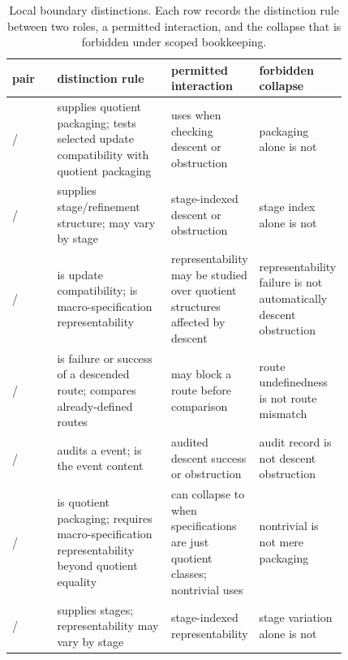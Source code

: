 
\begin{landscape}
\begin{table}
\caption{Local boundary distinctions. Each row records the distinction
rule between two roles, a permitted interaction, and the collapse that
is forbidden under scoped bookkeeping.}
\label{tab:boundary-matrix}
\centering
\footnotesize
\renewcommand{\arraystretch}{1.15}
\begin{tabular}{@{}lp{0.34\linewidth}p{0.24\linewidth}p{0.24\linewidth}@{}}
\toprule
pair & distinction rule & permitted interaction & forbidden collapse \\
\midrule
\Pone{}/\Pfive{} & \Pfive{} supplies quotient packaging; \Pone{} tests selected update compatibility with quotient packaging & \Pone{} uses \Pfive{} when checking descent or obstruction & packaging alone is not \Pone{} \\
\Pone{}/\Pfour{} & \Pfour{} supplies stage/refinement structure; \Pone{} may vary by stage & stage-indexed descent or obstruction & stage index alone is not \Pone{} \\
\Pone{}/\Ptwo{} & \Pone{} is update compatibility; \Ptwo{} is macro-specification representability & representability may be studied over quotient structures affected by descent & representability failure is not automatically descent obstruction \\
\Pone{}/\Pthree{} & \Pone{} is failure or success of a descended route; \Pthree{} compares already-defined routes & \Pone{} may block a route before \Pthree{} comparison & route undefinedness is not route mismatch \\
\Pone{}/\Psix{} & \Psix{} audits a \Pone{} event; \Pone{} is the event content & audited descent success or obstruction & audit record is not descent obstruction \\
\Ptwo{}/\Pfive{} & \Pfive{} is quotient packaging; \Ptwo{} requires macro-specification representability beyond quotient equality & \Ptwo{} can collapse to \Pfive{} when specifications are just quotient classes; nontrivial \Ptwo{} uses \Pfive{} & nontrivial \Ptwo{} is not mere packaging \\
\Ptwo{}/\Pfour{} & \Pfour{} supplies stages; \Ptwo{} representability may vary by stage & stage-indexed representability & stage variation alone is not \Ptwo{} \\

\end{tabular}
\end{table}
\end{landscape}
